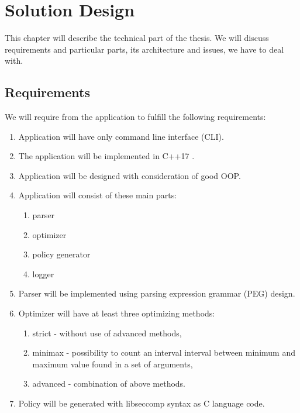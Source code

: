 \chapter{Solution Design}
\label{chap:design}
This chapter will describe the technical part of the thesis.
We will discuss requirements and particular parts, its architecture and issues, we have to deal with.

\section{Requirements}
\label{sec:requirements}
We will require from the application to fulfill the following requirements:
\begin{enumerate}
\item Application will have only command line interface (CLI).
\item The application will be implemented in C++17 \cite{ISO14882}.
\item Application will be designed with consideration of good OOP.
\item Application will consist of these main parts:
	\begin{enumerate}
    \item parser
    \item optimizer
    \item policy generator
    \item logger
	\end{enumerate}
\item Parser will be implemented using parsing expression grammar (PEG) \cite{PEG_def} design.
\item Optimizer will have at least three optimizing methods:
	\begin{enumerate}
    \item strict - without use of advanced methods,
    \item minimax - possibility to  count an interval interval between minimum and maximum value found in a set of arguments,
    \item advanced - combination of above methods.
	\end{enumerate}
\item Policy will be generated with libseccomp \cite{libseccomp_git} syntax as C language \cite{ISO9899} code.
\end{enumerate}
\pagebreak

